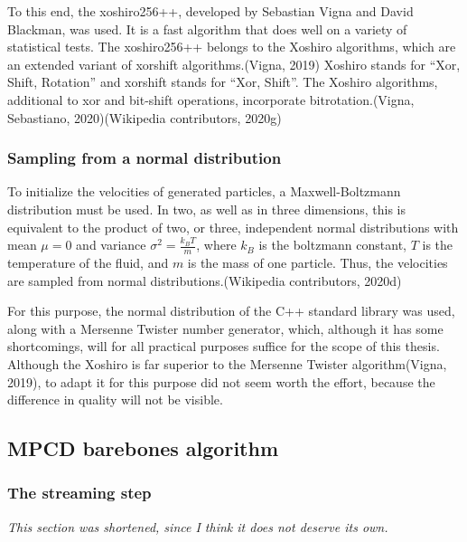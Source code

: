 \documentclass[
]{article}
\begin{document}
To this end, the xoshiro256++, developed by Sebastian Vigna and David
Blackman, was used. It is a fast algorithm that does well on a variety
of statistical tests. The xoshiro256++ belongs to the Xoshiro
algorithms, which are an extended variant of xorshift algorithms.(Vigna,
2019) Xoshiro stands for ``Xor, Shift, Rotation'' and xorshift stands
for ``Xor, Shift''. The Xoshiro algorithms, additional to xor and
bit-shift operations, incorporate bitrotation.(Vigna, Sebastiano,
2020)(Wikipedia contributors, 2020g)

\hypertarget{sampling-from-a-normal-distribution}{%
\subsubsection{Sampling from a normal
distribution}\label{sampling-from-a-normal-distribution}}

To initialize the velocities of generated particles, a Maxwell-Boltzmann
distribution must be used. In two, as well as in three dimensions, this
is equivalent to the product of two, or three, independent normal
distributions with mean \(\mu = 0\) and variance
\(\sigma^2 = \frac{k_{B}T}{m}\), where \(k_{B}\) is the boltzmann
constant, \(T\) is the temperature of the fluid, and \(m\) is the mass
of one particle. Thus, the velocities are sampled from normal
distributions.(Wikipedia contributors, 2020d)

For this purpose, the normal distribution of the C++ standard library
was used, along with a Mersenne Twister number generator, which,
although it has some shortcomings, will for all practical purposes
suffice for the scope of this thesis. Although the Xoshiro is far
superior to the Mersenne Twister algorithm(Vigna, 2019), to adapt it for
this purpose did not seem worth the effort, because the difference in
quality will not be visible.

\hypertarget{mpcd-barebones-algorithm}{%
\subsection{MPCD barebones algorithm}\label{mpcd-barebones-algorithm}}

\hypertarget{the-streaming-step-1}{%
\subsubsection{The streaming step}\label{the-streaming-step-1}}

\emph{This section was shortened, since I think it does not deserve its
own.}
\end{document}
